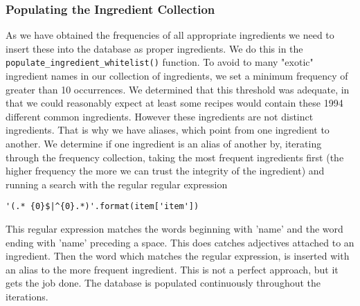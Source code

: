\documentclass{article}
\begin{document}
\subsubsection{Populating the Ingredient Collection}
As we have obtained the frequencies of all appropriate ingredients we need to insert
these into the database as proper ingredients. We do this in the
\texttt{populate\_ingredient\_whitelist()} function.
To avoid to many "exotic" ingredient names
in our collection of ingredients, we set a minimum frequency of greater than 10 occurrences. We
determined that this threshold was adequate, in that we could reasonably expect at least
some recipes would contain these 1994 different common ingredients. However these
ingredients are not distinct ingredients. That is why we have aliases, which point from
one ingredient to another. We determine if one ingredient is an alias of another by,
iterating through the frequency collection, taking the most frequent ingredients first
(the higher frequency the more we can trust the integrity of the ingredient) and running a
search with the regular regular expression
\begin{lstlisting}[basicstyle=\normalsize\ttfamily]
'(.* {0}$|^{0}.*)'.format(item['item'])\end{lstlisting}
This regular expression matches the words beginning with 'name' and the word ending with
'name' preceding a space. This does catches adjectives attached to an ingredient.
Then the word which matches the regular expression, is inserted with an alias to the more
frequent ingredient.  This is not a perfect approach, but it gets the job done. The
database is populated continuously throughout the iterations.
\end{document}
